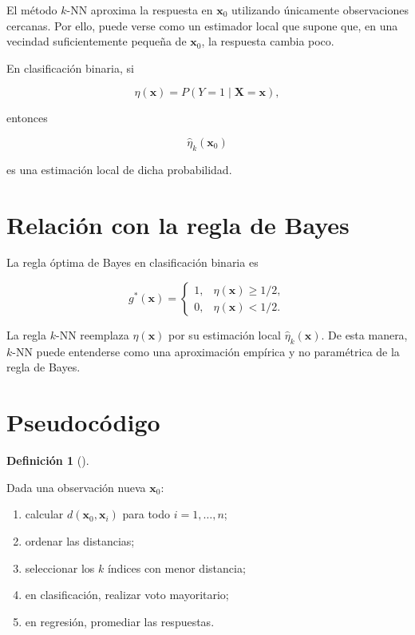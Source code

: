 \documentclass[
  spanish,
  10.5pt,
  letterpaper,
  DIV=11,
  numbers=noendperiod,
  oneside,
  open=any]{scrreprt}
\providecommand{\tightlist}{%
  \setlength{\itemsep}{0pt}\setlength{\parskip}{0pt}}
\theoremstyle{definition}
\newtheorem{definition}{Definición}[chapter]
\theoremstyle{definition}
\theoremstyle{plain}
\theoremstyle{remark}
\begin{document}

El método \(k\)-NN aproxima la respuesta en \(\mathbf{x}_0\) utilizando
únicamente observaciones cercanas. Por ello, puede verse como un
estimador local que supone que, en una vecindad suficientemente pequeña
de \(\mathbf{x}_0\), la respuesta cambia poco.

En clasificación binaria, si

\[
\eta(\mathbf{x})=P(Y=1\mid\mathbf{X}=\mathbf{x}),
\]

entonces

\[
\widehat{\eta}_k(\mathbf{x}_0)
\]

es una estimación local de dicha probabilidad.

\section*{Relación con la regla de
Bayes}\label{relaciuxf3n-con-la-regla-de-bayes}


La regla óptima de Bayes en clasificación binaria es

\[
g^*(\mathbf{x})
=
\begin{cases}
1, & \eta(\mathbf{x})\ge 1/2,\\
0, & \eta(\mathbf{x})<1/2.
\end{cases}
\]

La regla \(k\)-NN reemplaza \(\eta(\mathbf{x})\) por su estimación local
\(\widehat{\eta}_k(\mathbf{x})\). De esta manera, \(k\)-NN puede
entenderse como una aproximación empírica y no paramétrica de la regla
de Bayes.

\section*{Pseudocódigo}\label{pseudocuxf3digo}


\begin{definition}[]\protect\hypertarget{def-pseudocodigo-knn}{}\label{def-pseudocodigo-knn}

Dada una observación nueva \(\mathbf{x}_0\):

\begin{enumerate}
\def\labelenumi{\arabic{enumi}.}
\tightlist
\item
  calcular \(d(\mathbf{x}_0,\mathbf{x}_i)\) para todo \(i=1,\ldots,n\);
\item
  ordenar las distancias;
\item
  seleccionar los \(k\) índices con menor distancia;
\item
  en clasificación, realizar voto mayoritario;
\item
  en regresión, promediar las respuestas.
\end{enumerate}

\end{definition}
\end{document}
